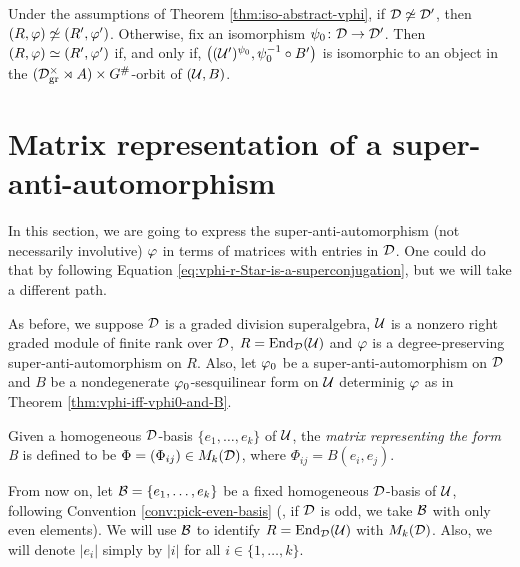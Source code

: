 \begin{cor}\label{cor:iso-with-actions}
    Under the assumptions of Theorem \ref{thm:iso-abstract-vphi}, if $\mathcal{D} \not \simeq \mathcal{D}'$, then $(R, \varphi) \not \simeq (R', \varphi')$. 
    Otherwise, fix an isomorphism $\psi_0\colon \mathcal{D} \to \mathcal{D}'$. 
    Then $(R, \varphi) \simeq (R', \varphi')$ if, and only if, $\big( (\mathcal U')^{\psi_0}, \psi_0^{-1} \circ B' \big)$ is isomorphic to an object in the $(\mathcal{D}^\times_{\mathrm{gr}} \rtimes A) \times G^\#$-orbit of $(\mathcal U, B)$. 
\end{cor}


\section{Matrix representation of a su\-per\--anti\--auto\-mor\-phism}

In this section, we are going to express the super-anti-automorphism (not necessarily involutive) $\varphi$ in terms of matrices with entries in $\mathcal{D}$. 
One could do that by following Equation \eqref{eq:vphi-r-Star-is-a-superconjugation}, but we will take a different path. 

As before, we suppose $\mathcal{D}$ is a graded division superalgebra, $\mathcal U$ is a nonzero right graded module of finite rank over $\mathcal{D}$, $R = \operatorname{End}_{\mathcal{D}} (\mathcal U)$ and $\varphi$ is a degree-preserving super-anti-automorphism on $R$. 
Also, let $\varphi_0$ be a super-anti-automorphism on $\mathcal{D}$ and $B$ be a nondegenerate $\varphi_0$-sesquilinear form on $\mathcal U$ determinig $\varphi$ as in Theorem \ref{thm:vphi-iff-vphi0-and-B}.

\begin{defi}\label{def:matrix-representing-B}
    Given a homogeneous $\mathcal{D}$-basis $\{e_1, \ldots, e_k\}$ of $\mathcal U$, the \emph{matrix representing the form B} is defined to be $\Phi = (\Phi_{ij}) \in M_k(\mathcal{D})$, where $\Phi_{ij} = B(e_i, e_j)$.
\end{defi}

From now on, let $\mathcal B = \{e_1, \ldots, e_k\}$ be a fixed homogeneous $\mathcal{D}$-basis of $\mathcal U$, following Convention \ref{conv:pick-even-basis} (\ie, if $\mathcal{D}$ is odd, we take $\mathcal B$ with only even elements). 
We will use $\mathcal B$ to identify $R = \operatorname{End}_{\mathcal{D}} (\mathcal U)$ with $M_k (\mathcal{D})$. 
Also, we will denote $|e_i|$ simply by $|i|$ for all $i \in \{1, \ldots, k\}$. 


